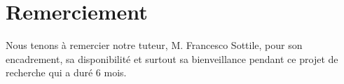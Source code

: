 \chapter*{Remerciement}
Nous tenons à remercier notre tuteur, M. Francesco Sottile, pour son encadrement, sa disponibilité et surtout sa bienveillance pendant ce projet de recherche qui a duré 6 mois.